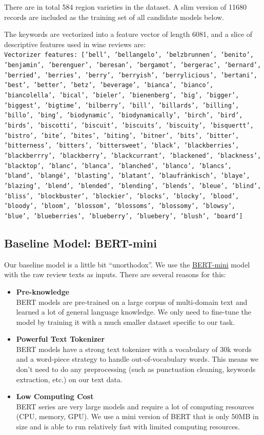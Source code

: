 \documentclass[
	a4paper,
	fontsize=10pt, %
	twoside=false, %
	secnumdepth=2, %
]{kaohandt}
\begin{document}
There are in total 584 region varieties in the dataset. A slim version of 11680 records are included as the training set of all candidate models below.

The keywords are vectorized into a feature vector of length 6081, and a slice of descriptive features used in wine reviews are: \\

\texttt{Vectorizer features: ['bell', 'bellangelo', 'belzbrunnen', 'benito', 'benjamin', 'berenguer', 'beresan', 'bergamot', 'bergerac', 'bernard', 'berried', 'berries', 'berry', 'berryish', 'berrylicious', 'bertani', 'best', 'better', 'betz', 'beverage', 'bianca', 'bianco', 'biancolella', 'bical', 'bieler', 'bienenberg', 'big', 'bigger', 'biggest', 'bigtime', 'bilberry', 'bill', 'billards', 'billing', 'billo', 'bing', 'biodynamic', 'biodynamically', 'birch', 'bird', 'birds', 'biscotti', 'biscuit', 'biscuits', 'biscuity', 'bisquertt', 'bistro', 'bite', 'bites', 'biting', 'bitner', 'bits', 'bitter', 'bitterness', 'bitters', 'bittersweet', 'black', 'blackberries', 'blackberrry', 'blackberry', 'blackcurrant', 'blackened', 'blackness', 'blacktop', 'blanc', 'blanca', 'blanched', 'blanco', 'blancs', 'bland', 'blangé', 'blasting', 'blatant', 'blaufränkisch', 'blaye', 'blazing', 'blend', 'blended', 'blending', 'blends', 'bleue', 'blind', 'bliss', 'blockbuster', 'blockier', 'blocks', 'blocky', 'blood', 'bloody', 'bloom', 'blossom', 'blossoms', 'blossomy', 'blowsy', 'blue', 'blueberries', 'blueberry', 'bluebery', 'blush', 'board']}

\subsection{Baseline Model: BERT-mini}

Our baseline model is a little bit “unorthodox”. We use the \href{https://huggingface.co/google/bert_uncased_L-4_H-256_A-4}{BERT-mini} model with the raw review texts as inputs. There are several reasons for this:

\begin{itemize}
	\item \textbf{Pre-knowledge} \\
	BERT models are pre-trained on a large corpus of multi-domain text and learned a lot of general language knowledge. We only need to fine-tune the model by training it with a much smaller dataset specific to our task.
	\item \textbf{Powerful Text Tokenizer} \\
	BERT models have a strong text tokenizer with a vocabulary of 30k words and a word-piece strategy to handle out-of-vocabulary words. This means we don’t need to do any preprocessing (such as punctuation cleaning, keywords extraction, etc.) on our text data.
	\item \textbf{Low Computing Cost} \\
	BERT series are very large models and require a lot of computing resources (CPU, memory, GPU). We use a mini version of BERT that is only 50MB in size and is able to run relatively fast with limited computing resources.
\end{itemize}
\end{document}
